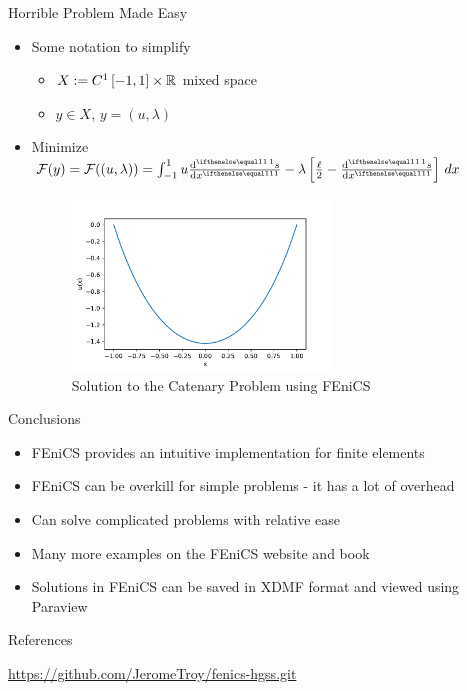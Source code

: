 \documentclass[serif]{beamer}
\begin{document}
\begin{frame}{Horrible Problem Made Easy}
    \begin{itemize}
        \item Some notation to simplify
        \begin{itemize}
            \item $X:= C^1\left[-1, 1\right] \times \mathbb{R}$ mixed space
            \item $y \in X$, $y = (u, \lambda)$
        \end{itemize}
        \item Minimize $\mathcal F(y) = \mathcal F((u, \lambda)) = \int_{-1}^1 u \der{s}{x} - \lambda \left[\frac{\ell}{2} - 
            \der{s}{x}\right] \, dx$
        \begin{figure}
            \centering
            \includegraphics[width=0.65\textwidth,height=0.65\textheight,keepaspectratio]
            {figures/fenics-catenary.pdf}
            \caption{Solution to the Catenary Problem using FEniCS}
            \label{fig:fenics-catenary}
        \end{figure}
    \end{itemize}
\end{frame}

\begin{frame}{Conclusions}
	\begin{itemize}
		\item FEniCS provides an intuitive implementation for finite elements
		\item FEniCS can be overkill for simple problems - it has a lot of overhead
		\item Can solve complicated problems with relative ease
		\item Many more examples on the FEniCS website and book  
		\item Solutions in FEniCS can be saved in XDMF format and viewed using 
			Paraview
	\end{itemize}
\end{frame}

\begin{frame}{References}
    \nocite{*}
    
    
    
    \url{https://github.com/JeromeTroy/fenics-hgss.git}
\end{frame}
\end{document}

